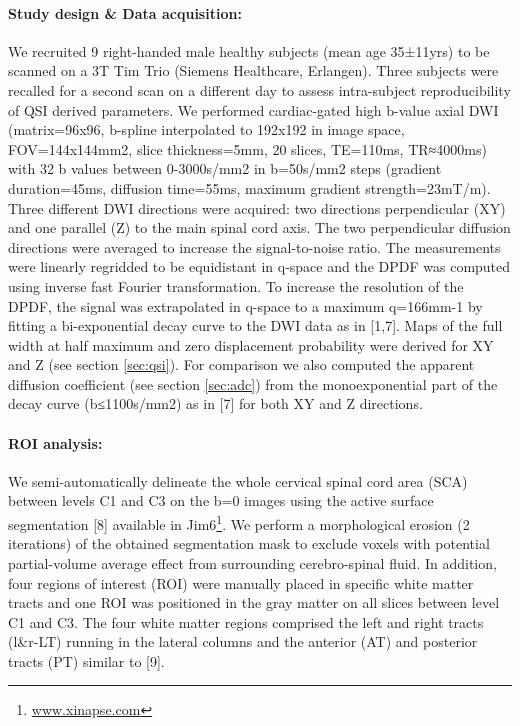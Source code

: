 \paragraph{Study design \& Data acquisition:} We recruited 9 right-handed male healthy subjects (mean age 35±11yrs) to be scanned on a 3T Tim Trio (Siemens Healthcare, Erlangen). Three subjects were recalled for a second scan on a different day to assess intra-subject reproducibility of QSI derived parameters. We performed cardiac-gated high b-value axial DWI (matrix=96x96, b-spline interpolated to 192x192 in image space, FOV=144x144mm2, slice thickness=5mm, 20 slices, TE=110ms, TR≈4000ms) with 32 b values between 0-3000s/mm2 in b=50s/mm2 steps (gradient duration=45ms, diffusion time=55ms, maximum gradient strength=23mT/m). Three different DWI directions were acquired: two directions perpendicular (XY) and one parallel (Z) to the main spinal cord axis. The two perpendicular diffusion directions were averaged to increase the signal-to-noise ratio. The measurements were linearly regridded to be equidistant in q-space and the DPDF was computed using inverse fast Fourier transformation. To increase the resolution of the DPDF, the signal was extrapolated in q-space to a maximum q=166mm-1 by fitting a bi-exponential decay curve to the DWI data as in [1,7]. Maps of the full width at half maximum and zero displacement probability were derived for XY and Z (see section \ref{sec:qsi}). For comparison we also computed the apparent diffusion coefficient (see section \ref{sec:adc}) from the monoexponential part of the decay curve (b≤1100s/mm2) as in [7] for both XY and Z directions. 
\paragraph{ROI analysis:} We semi-automatically delineate the whole cervical spinal cord area (SCA) between levels C1 and C3 on the b=0 images using the active surface segmentation [8] available in Jim6\footnote{\url{www.xinapse.com}}. We perform a morphological erosion (2 iterations) of the obtained segmentation mask to exclude voxels with potential partial-volume average effect from surrounding cerebro-spinal fluid. In addition, four regions of interest (ROI) were manually placed in specific white matter tracts and one ROI was positioned in the gray matter on all slices between level C1 and C3. The four white matter regions comprised the left and right tracts (l\&r-LT) running in the lateral columns and the anterior (AT) and posterior tracts (PT) similar to [9]. 
